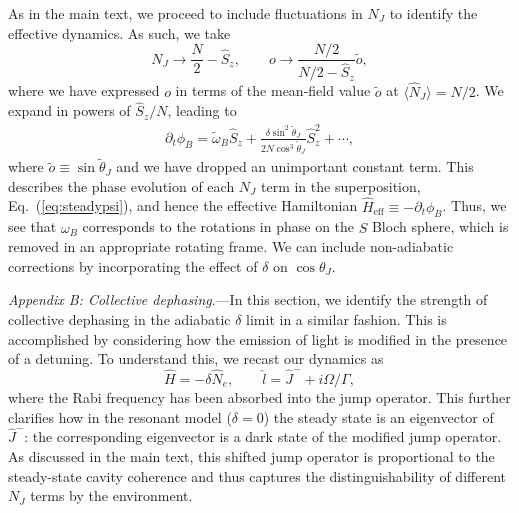 \documentclass[11pt]{article}
\begin{document}
As in the main text, we proceed to include fluctuations in $N_J$ to identify the effective dynamics. As such, we take
\begin{equation}
    N_J \to \frac{N}{2} - \hat S_z, \qquad o \to \frac{N/2}{N/2-\hat S_z} \tilde{o},
\end{equation}
where we have expressed $o$ in terms of the mean-field value $\tilde{o}$ at $\langle \hat N_J \rangle = N/2$. We expand in powers of $\hat S_z/N$, leading to
\begin{equation}
\begin{aligned}
    \partial_t \phi_B = \tilde{\omega}_B \hat S_z + \frac{\delta \sin^2 \tilde{\theta}_J}{2 N \cos^3 \tilde{\theta}_J} \hat S_z^2 + \cdots,
    \end{aligned}
\end{equation}
where $\tilde{o} \equiv \sin \tilde{\theta}_J$ and we have dropped an unimportant constant term. This describes the phase evolution of each $N_J$ term in the superposition, Eq.~(\ref{eq:steadypsi}), and hence the effective Hamiltonian $\hat H_\text{eff} \equiv -\partial_t \phi_B$.
Thus, we see that $\omega_B$ corresponds to the rotations in phase on the $\hat S$ Bloch sphere, which is removed in an appropriate rotating frame. We can include non-adiabatic corrections by incorporating the effect of $\delta$ on $\cos \theta_J$.

\emph{Appendix B: Collective dephasing}.---In this section, we identify the strength of collective dephasing in the adiabatic $\delta$ limit in a similar fashion. This is accomplished by considering how the emission of light is modified in the presence of a detuning. To understand this, we recast our dynamics as
\begin{equation}
    \hat H = -\delta \hat N_e, \qquad \hat l = \hat J^- + i \Omega/\Gamma,
\end{equation}
where the Rabi frequency has been absorbed into the jump operator. This further clarifies how in the resonant model ($\delta = 0$) the steady state is an eigenvector of $\hat J^-$: the corresponding eigenvector is a dark state of the modified jump operator. As discussed in the main text, this shifted jump operator is proportional to the steady-state cavity coherence and thus captures the distinguishability of different $N_J$ terms by the environment.
\end{document}
